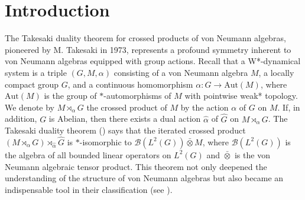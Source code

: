 \documentclass[reqno,11pt]{amsart}
\theoremstyle{plain}
\theoremstyle{definition}
\theoremstyle{remark}
\begin{document}
\date{\today}
\maketitle



\section{Introduction}

The Takesaki duality theorem for crossed products of von Neumann algebras, pioneered by M. Takesaki in 1973, represents a profound symmetry inherent to von Neumann algebras equipped with group actions.
Recall that a W*-dynamical system is a triple $(G,M,\alpha)$ consisting of a von Neumann algebra $M$, a locally compact group $G$, and a continuous homomorphism $\alpha:G\rightarrow \mathrm{Aut}(M)$, where $\mathrm{Aut}(M)$ is the group of $*$-automorphisms of $M$ with pointwise weak* topology. We denote by $M\rtimes_\alpha G$ the crossed product of $M$  by the action $\alpha$ of $G$ on $M$.
If, in addition, $G$ is Abelian, then there exists a dual action $\hat{\alpha}$ of $\hat{G}$ on $M\rtimes_\alpha G$. The Takesaki duality theorem (\cite[Theorem4.5]{dual}) says that the iterated crossed product $(M\rtimes_{\alpha}G)\rtimes _{\hat{\alpha}}\hat{G}$ is $*$-isomorphic to $\mathcal{B}(L^2(G))\bar{\otimes} M$, where $\mathcal{B}(L^2(G))$ is the algebra of all bounded linear operators on $L^2(G)$ and $\bar{\otimes}$ is the von Neumann algebraic tensor product. This theorem not only deepened the understanding of the structure of von Neumann algebras but also became an indispensable tool in their classification (see \cite{Takesaki}).








\end{document}
